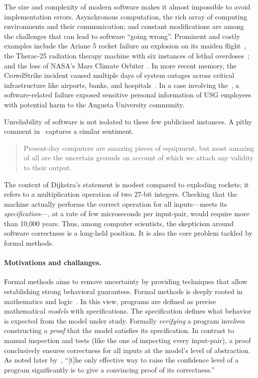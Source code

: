 The size and complexity of modern software makes it almost impossible to avoid implementation errors.
Asynchronous computation, the rich array of computing environments and their communication;
and constant modifications are among the challenges that can lead to software \enquote{going wrong}.
Prominent and costly examples include
the Ariane 5 rocket failure an explosion on its maiden flight~\cite{ariane5},
the Therac-25 radiation therapy machine with six instances of lethal overdoses~\cite{leveson1993};
and the loss of NASA's Mars Climate Orbiter~\cite{mars1999}.
In more recent memory, the CrowdStrike incident caused multiple days of system outages
 across critical infrastructure like airports, banks, and hospitals~\cite{crowdstrike}.
In a case involving the~\textcite{usg2024},
a software-related failure exposed sensitive personal information of USG employees with potential harm to the Augusta University community.

Unreliability of software is not isolated to these few publicized instances.
A pithy comment in~\textcite[p. 3]{dijkstra1970} captures a similar sentiment.

\begin{quotation}
\noindent{}Present-day computers are amazing pieces of equipment,
but most amazing of all are the uncertain grounds on account of which we attach any validity to their output.
\end{quotation}

The context of Dijkstra's statement is modest compared to exploding rockets;
it refers to a multiplication operation of two 27-bit integers.
Checking that the machine actually performs the correct operation for all inputs---\ie meets its \emph{specification}---,
at a rate of few microseconds per input-pair, would require more than 10,000 years.
Thus, among computer scientists, the skepticism around software correctness is a long-held position.
It is also the core problem tackled by formal methods.

\paragraph*{Motivations and challanges.}
Formal methods aims to remove uncertainty by providing techniques that allow establishing strong behavioral guarantees.
Formal methods is deeply rooted in mathematics and logic~\cite{shankar2023}.
In this view, programs are defined as precise mathematical \emph{models} with {specifications}.
The specification defines what behavior is expected from the model under study.
Formally \emph{verifying} a program involves constructing a \emph{proof} that the model satisfies its specification.
In contrast to manual inspection and tests (like the one of inspecting every input-pair),
a proof conclusively ensures correctness for all inputs at the model's level of abstraction.
As noted later by~\textcite{dijkstra1972}, \enquote{{[t]he only effective way to raise the confidence level of a program significantly is to give a convincing proof of its correctness.}}

